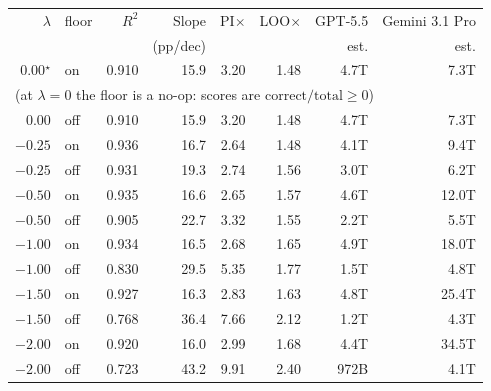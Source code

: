 \begin{tabular}{rlrrrrrr}
\toprule
$\lambda$ & floor & $R^2$ & Slope & PI$\times$ & LOO$\times$ & GPT-5.5 & Gemini 3.1 Pro \\
 & & & (pp/dec) & & & est. & est. \\
\midrule
$0.00$$^\star$ & on & 0.910 & 15.9 & 3.20 & 1.48 & 4.7T & 7.3T \\
\multicolumn{8}{l}{\footnotesize\quad(at $\lambda=0$ the floor is a no-op: scores are $\text{correct}/\text{total}\geq 0$)} \\
$0.00$ & off & 0.910 & 15.9 & 3.20 & 1.48 & 4.7T & 7.3T \\
$-0.25$ & on & 0.936 & 16.7 & 2.64 & 1.48 & 4.1T & 9.4T \\
$-0.25$ & off & 0.931 & 19.3 & 2.74 & 1.56 & 3.0T & 6.2T \\
$-0.50$ & on & 0.935 & 16.6 & 2.65 & 1.57 & 4.6T & 12.0T \\
$-0.50$ & off & 0.905 & 22.7 & 3.32 & 1.55 & 2.2T & 5.5T \\
$-1.00$ & on & 0.934 & 16.5 & 2.68 & 1.65 & 4.9T & 18.0T \\
$-1.00$ & off & 0.830 & 29.5 & 5.35 & 1.77 & 1.5T & 4.8T \\
$-1.50$ & on & 0.927 & 16.3 & 2.83 & 1.63 & 4.8T & 25.4T \\
$-1.50$ & off & 0.768 & 36.4 & 7.66 & 2.12 & 1.2T & 4.3T \\
$-2.00$ & on & 0.920 & 16.0 & 2.99 & 1.68 & 4.4T & 34.5T \\
$-2.00$ & off & 0.723 & 43.2 & 9.91 & 2.40 & 972B & 4.1T \\
\bottomrule
\end{tabular}
